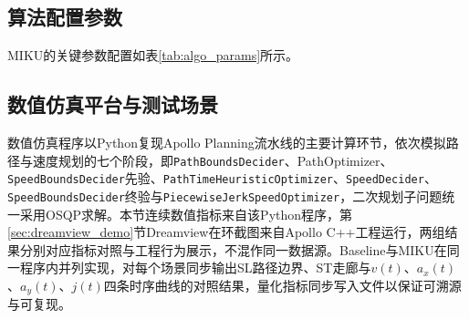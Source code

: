 \subsection{算法配置参数}

MIKU的关键参数配置如表\ref{tab:algo_params}所示。

\begin{table}[htbp]
\centering
\caption{MIKU关键参数配置}
\label{tab:algo_params}
\small
{}
\end{table}

\subsection{数值仿真平台与测试场景}

数值仿真程序以Python复现Apollo Planning流水线的主要计算环节，依次模拟路径与速度规划的七个阶段，即\texttt{PathBoundsDecider}、PathOptimizer、\texttt{SpeedBoundsDecider}先验、\texttt{PathTimeHeuristicOptimizer}、\texttt{SpeedDecider}、\texttt{SpeedBoundsDecider}终验与\texttt{PiecewiseJerkSpeedOptimizer}，二次规划子问题统一采用OSQP求解。本节连续数值指标来自该Python程序，第\ref{sec:dreamview_demo}节Dreamview在环截图来自Apollo C++工程运行，两组结果分别对应指标对照与工程行为展示，不混作同一数据源。Baseline与MIKU在同一程序内并列实现，对每个场景同步输出SL路径边界、ST走廊与$v(t)$、$a_x(t)$、$a_y(t)$、$j(t)$四条时序曲线的对照结果，量化指标同步写入文件以保证可溯源与可复现。

